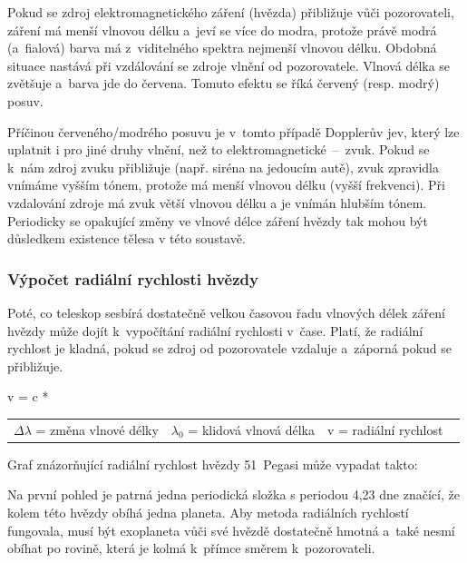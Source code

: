 \documentclass[a4paper,12pt]{article}
\begin{document}
{{Pokud se zdroj elektromagnetického záření (hvězda) přibližuje vůči pozorovateli, záření má menší vlnovou délku a~jeví se více do modra, protože právě modrá (a~fialová) barva má z~viditelného spektra nejmenší vlnovou délku. Obdobná situace nastává při vzdálování se zdroje vlnění od pozorovatele. Vlnová délka se zvětšuje a~barva jde do červena. Tomuto efektu se říká červený (resp. modrý) posuv.~\cite{methods}

\drawgimp

Příčinou červeného/modrého posuvu je v~tomto případě Dopplerův jev, který lze uplatnit i pro jiné druhy vlnění, než to elektromagnetické~--~zvuk. Pokud se k~nám zdroj zvuku přibližuje (např. siréna na jedoucím autě), zvuk zpravidla vnímáme vyšším tónem, protože má menší vlnovou délku (vyšší frekvenci). Při vzdalování zdroje má zvuk větší vlnovou délku a je vnímán hlubším tónem.~\cite{radialvelocity} Periodicky se opakující změny ve vlnové délce záření hvězdy tak mohou být důsledkem existence tělesa v této soustavě.~\cite{methods}

\subsubsection{Výpočet radiální rychlosti hvězdy}

Poté, co teleskop sesbírá dostatečně velkou časovou řadu vlnových délek záření hvězdy může dojít k~vypočítání radiální rychlosti v~čase. Platí, že radiální rychlost je kladná, pokud se zdroj od pozorovatele vzdaluje a~záporná pokud se přibližuje.~\cite{methods}

 {v = c * }{
\begin{tabular}{lll}
	$\Delta\lambda$ = změna vlnové délky & $\lambda_0$ = klidová vlnová délka & v = radiální rychlost \
\end{tabular}
}

Graf znázorňující radiální rychlost hvězdy 51~Pegasi může vypadat takto:

\data{1}{51pegasi}

Na první pohled je patrná jedna periodická složka s periodou 4,23 dne značící, že kolem této hvězdy obíhá jedna planeta. Aby metoda radiálních rychlostí fungovala, musí být exoplaneta vůči své hvězdě dostatečně hmotná a~také nesmí obíhat po rovině, která je kolmá k~přímce směrem k~pozorovateli.

}}
\end{document}
